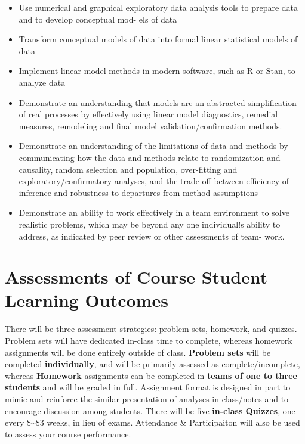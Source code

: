 \documentclass[
  letterpaper,
  DIV=11,
  numbers=noendperiod]{scrreprt}
\providecommand{\tightlist}{%
  \setlength{\itemsep}{0pt}\setlength{\parskip}{0pt}}\usepackage{longtable,booktabs,array}
\begin{document}
\begin{itemize}
\tightlist
\item
  Use numerical and graphical exploratory data analysis tools to prepare
  data and to develop conceptual mod- els of data
\item
  Transform conceptual models of data into formal linear statistical
  models of data
\item
  Implement linear model methods in modern software, such as R or Stan,
  to analyze data
\item
  Demonstrate an understanding that models are an abstracted
  simplification of real processes by effectively using linear model
  diagnostics, remedial measures, remodeling and final model
  validation/confirmation methods.
\item
  Demonstrate an understanding of the limitations of data and methods by
  communicating how the data and methods relate to randomization and
  causality, random selection and population, over-fitting and
  exploratory/confirmatory analyses, and the trade-off between
  efficiency of inference and robustness to departures from method
  assumptions
\item
  Demonstrate an ability to work effectively in a team environment to
  solve realistic problems, which may be beyond any one individual!s
  ability to address, as indicated by peer review or other assessments
  of team- work.
\end{itemize}

\hypertarget{sec-assess}{%
\section{Assessments of Course Student Learning
Outcomes}\label{sec-assess}}

There will be three assessment strategies: problem sets, homework, and
quizzes. Problem sets will have dedicated in-class time to complete,
whereas homework assignments will be done entirely outside of class.
\textbf{Problem sets} will be completed \textbf{individually}, and will
be primarily assessed as complete/incomplete, whereas \textbf{Homework}
assignments can be completed in \textbf{teams of one to three students}
and will be graded in full. Assignment format is designed in part to
mimic and reinforce the similar presentation of analyses in class/notes
and to encourage discussion among students. There will be five
\textbf{in-class Quizzes}, one every \$\sim\$3 weeks, in lieu of exams.
Attendance \& Participaiton will also be used to assess your course
performance.
\end{document}
